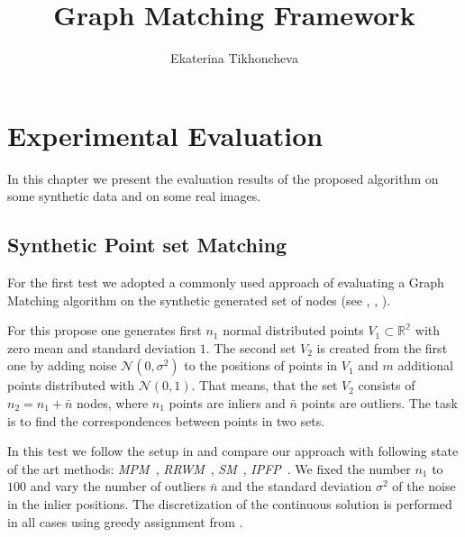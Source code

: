 \documentclass[
	fontsize=12pt,
	paper=a4,
	twoside=false,
	numbers=noenddot,
	plainheadsepline,
	toc=listof,
	toc=bibliography
]{scrartcl}
\begin{document}
\pagestyle{plain}

\title{Graph Matching Framework}
\author{Ekaterina Tikhoncheva}
\date{} 

\maketitle 



\section{Experimental Evaluation}

In this chapter we present the evaluation results of the proposed algorithm on some synthetic data and on some real images.

\subsection{Synthetic Point set Matching}

For the first test we adopted a commonly used approach of evaluating a Graph Matching algorithm on the synthetic generated set of nodes (see \cite{Cho2014_Haystack}, \cite{Cho2010_RRWM}, \cite{Leordeanu2009_IPFP}). 

For this propose one generates first $n_1$ normal distributed points $V_1\subset\mathbb{R^2}$ with zero mean and standard deviation $1$. The second set $V_2$ is created from the first one by adding noise $\mathcal{N}(0,\sigma^2)$ to the positions of points in $V_1$ and $m$ additional points distributed with $\mathcal{N}(0,1)$.  That means, that the set $V_2$ consists of $n_2=n_1+\bar{n}$ nodes, where $n_1$ points are inliers and $\bar{n}$ points are outliers. The task is to find the correspondences between points in two sets.

In this test we follow the setup in \cite{Cho2014_Haystack} and compare our approach with following state of the art methods: \emph{MPM}~\cite{Cho2014_Haystack}, \emph{RRWM}~\cite{Cho2010_RRWM}, \emph{SM}~\cite{Leordeanu2005}, \emph{IPFP}~\cite{Leordeanu2009_IPFP}. We fixed the number $n_1$ to $100$ and vary the number of outliers $\bar{n}$ and the standard deviation $\sigma^2$ of the noise in the inlier positions. The discretization of the continuous solution is performed in all cases using greedy assignment from \cite{Leordeanu2005}.
\end{document}
